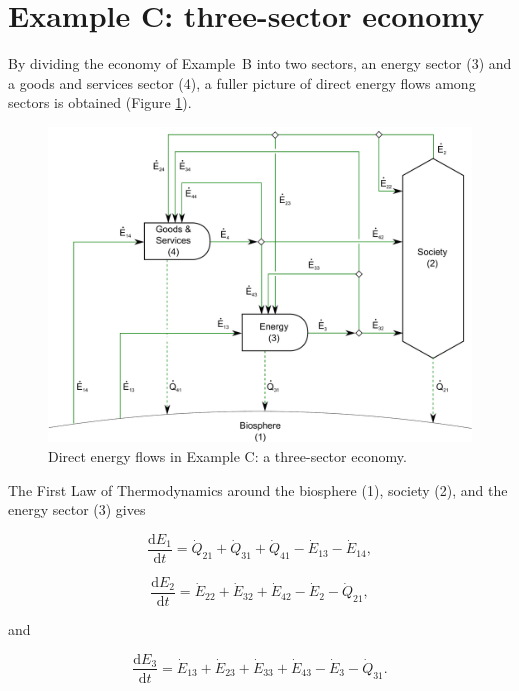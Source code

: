 \section{Example C: three-sector economy}
\label{sec:C_energy}

By dividing the economy of Example~B into two sectors,
an energy sector (3) and a goods and services sector (4), 
a fuller picture of direct energy flows among sectors is obtained
(Figure \ref{fig:C_energy}).

\begin{figure}[h!]
\centering
\includegraphics[width=0.8\linewidth]{Part_2/Chapter_Energy/images/3_sector_direct_energy.pdf}
\caption{Direct energy flows in Example C: a three-sector economy.}
\label{fig:C_energy}
\end{figure}

The First Law of Thermodynamics around the 
biosphere (1), society (2), and the energy sector (3) gives

\begin{equation} \label{eq:C-CV_E_dot_1}
	\frac{\mathrm{d}E_{1}}{\mathrm{d}t} 	 
	= \dot{Q}_{21} 
	+ \dot{Q}_{31} 
	+ \dot{Q}_{41} 
	- \dot{E}_{13} 
	- \dot{E}_{14},
\end{equation}

\begin{equation} \label{eq:C-CV_E_dot_2}
	\frac{\mathrm{d}E_{2}}{\mathrm{d}t}
	= \dot{E}_{22}
	+ \dot{E}_{32}  
	+ \dot{E}_{42} 
	- \dot{E}_{2}
	- \dot{Q}_{21},
\end{equation}

\noindent and 

\begin{equation} \label{eq:C-CV_E_dot_3}
	\frac{\mathrm{d}E_{3}}{\mathrm{d}t} 	 
	= \dot{E}_{13} 
	+ \dot{E}_{23}
	+ \dot{E}_{33} 
	+ \dot{E}_{43} 
	- \dot{E}_{3} 
	- \dot{Q}_{31}.
\end{equation}

